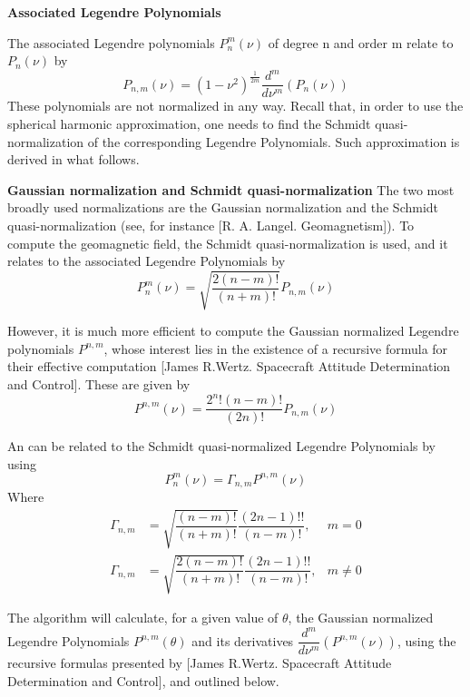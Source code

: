 {\bf Associated Legendre Polynomials}

The associated Legendre polynomials $P_n^m(\nu)$ of degree n and order m relate to $P_n(\nu)$ by
\begin{equation}
P_{n,m}(\nu) = (1-\nu^2)^{\frac{1}{2m}} \dfrac{d^m}{d\nu^m}(P_n(\nu))
\end{equation}
These polynomials are not normalized in any way. %
Recall that, in order to use the spherical harmonic approximation, one needs to find the Schmidt quasi-normalization of the corresponding Legendre Polynomials. Such approximation is derived in what follows.

{\bf Gaussian normalization and Schmidt quasi-normalization}
The two most broadly used normalizations are the Gaussian normalization and the Schmidt quasi-normalization (see, for instance [R. A. Langel. Geomagnetism]).
To compute the geomagnetic field, the Schmidt quasi-normalization is used, and it relates to the associated Legendre Polynomials by
\begin{equation}
P_n^m(\nu) = \sqrt{\dfrac{2(n-m)!}{(n+m)!}} P_{n,m}(\nu) 
\end{equation}

However, it is much more efficient to compute the Gaussian normalized Legendre polynomials $P^{n,m}$, whose interest lies in the existence of a recursive formula for their effective computation [James R.Wertz. Spacecraft Attitude Determination and Control]. These are given by
\begin{equation}
P^{n,m}(\nu) = \dfrac{2^n! (n-m)!}{(2n)!} P_{n,m}(\nu)
\end{equation}

An can be related to the Schmidt quasi-normalized Legendre Polynomials by using
\begin{equation}
P_n^m(\nu) = \Gamma_{n,m} P^{n,m}(\nu)
\end{equation}
Where
\begin{equation}
\begin{aligned}
\Gamma_{n,m} &= \sqrt{\dfrac{(n-m)!}{(n+m)!}}\dfrac{(2n-1)!!}{(n-m)!}, &m = 0\\
\Gamma_{n,m} &= \sqrt{\dfrac{2(n-m)!}{(n+m)!}}\dfrac{(2n-1)!!}{(n-m)!}, &m \neq 0
\end{aligned}
\end{equation}

The algorithm will calculate, for a given value of $\theta$, the Gaussian normalized Legendre Polynomials $P^{n,m}(\theta)$ and its derivatives $\dfrac{d^m}{d\nu^m}(P^{n,m}(\nu))$, using the recursive formulas presented by [James R.Wertz. Spacecraft Attitude Determination and Control], and outlined below.

